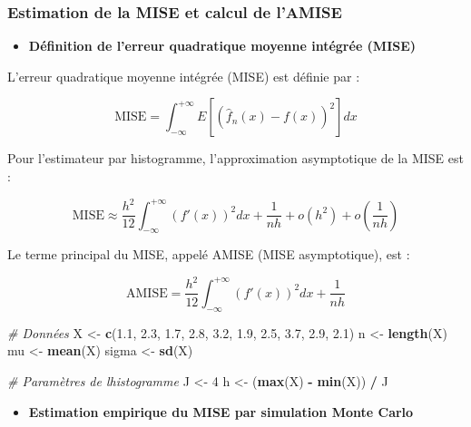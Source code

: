 \documentclass[
  12pt,
]{article}
\newenvironment{Shaded}{\begin{snugshade}}{\end{snugshade}}
\newcommand{\CommentTok}[1]{\textcolor[rgb]{0.56,0.35,0.01}{\textit{#1}}}
\newcommand{\DecValTok}[1]{\textcolor[rgb]{0.00,0.00,0.81}{#1}}
\newcommand{\FloatTok}[1]{\textcolor[rgb]{0.00,0.00,0.81}{#1}}
\newcommand{\FunctionTok}[1]{\textcolor[rgb]{0.13,0.29,0.53}{\textbf{#1}}}
\newcommand{\NormalTok}[1]{#1}
\newcommand{\OtherTok}[1]{\textcolor[rgb]{0.56,0.35,0.01}{#1}}
\newcommand{\SpecialCharTok}[1]{\textcolor[rgb]{0.81,0.36,0.00}{\textbf{#1}}}
\providecommand{\tightlist}{%
  \setlength{\itemsep}{0pt}\setlength{\parskip}{0pt}}
\begin{document}
\subsubsection{Estimation de la MISE et calcul de
l'AMISE}\label{estimation-de-la-mise-et-calcul-de-lamise}

\begin{itemize}
\tightlist
\item
  \textbf{Définition de l'erreur quadratique moyenne intégrée (MISE)}
\end{itemize}

L'erreur quadratique moyenne intégrée (MISE) est définie par :

\[
\text{MISE} = \int_{-\infty}^{+\infty} E\left[(\hat{f}_n(x) - f(x))^2\right] dx
\]

Pour l'estimateur par histogramme, l'approximation asymptotique de la
MISE est :

\[
\text{MISE} \approx \frac{h^2}{12}\int_{-\infty}^{+\infty} (f'(x))^2 dx + \frac{1}{nh} + o(h^2) + o\left(\frac{1}{nh}\right)
\]

Le terme principal du MISE, appelé AMISE (MISE asymptotique), est :

\[
\text{AMISE} = \frac{h^2}{12}\int_{-\infty}^{+\infty} (f'(x))^2 dx + \frac{1}{nh}
\]

\begin{Shaded}
\begin{Highlighting}[]
\CommentTok{\# Données }
\NormalTok{X }\OtherTok{\textless{}{-}} \FunctionTok{c}\NormalTok{(}\FloatTok{1.1}\NormalTok{, }\FloatTok{2.3}\NormalTok{, }\FloatTok{1.7}\NormalTok{, }\FloatTok{2.8}\NormalTok{, }\FloatTok{3.2}\NormalTok{, }\FloatTok{1.9}\NormalTok{, }\FloatTok{2.5}\NormalTok{, }\FloatTok{3.7}\NormalTok{, }\FloatTok{2.9}\NormalTok{, }\FloatTok{2.1}\NormalTok{)}
\NormalTok{n }\OtherTok{\textless{}{-}} \FunctionTok{length}\NormalTok{(X)}
\NormalTok{mu }\OtherTok{\textless{}{-}} \FunctionTok{mean}\NormalTok{(X)}
\NormalTok{sigma }\OtherTok{\textless{}{-}} \FunctionTok{sd}\NormalTok{(X)}

\CommentTok{\# Paramètres de l\textquotesingle{}histogramme}
\NormalTok{J }\OtherTok{\textless{}{-}} \DecValTok{4}
\NormalTok{h }\OtherTok{\textless{}{-}}\NormalTok{ (}\FunctionTok{max}\NormalTok{(X) }\SpecialCharTok{{-}} \FunctionTok{min}\NormalTok{(X)) }\SpecialCharTok{/}\NormalTok{ J}
\end{Highlighting}
\end{Shaded}

\begin{itemize}
\tightlist
\item
  \textbf{Estimation empirique du MISE par simulation Monte Carlo}
\end{itemize}
\end{document}
